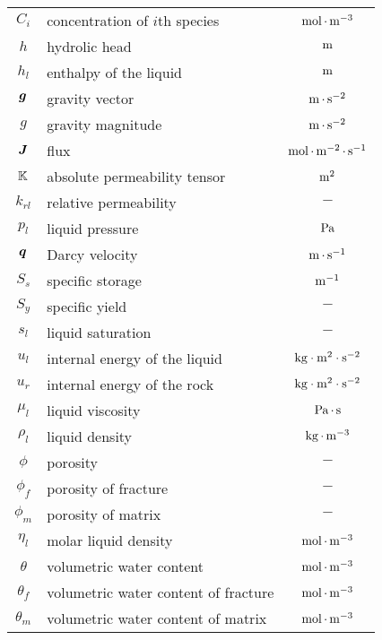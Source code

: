 \begin{center}
\begin{longtable}{cp{7cm}c}
$C_i$      & concentration of $i$th species    &  ${\rm mol}{\,\cdot\,}{\rm m}^{-3}$ \\
$h$        & hydrolic head        &  ${\rm m}$  \\
$h_l$      & enthalpy of the liquid        &  ${\rm m}$  \\
${\boldsymbol{g}}$      & gravity vector       &  ${\rm m}{\,\cdot\,}{\rm s}^{-2}$  \\
$g$        & gravity magnitude    &  ${\rm m}{\,\cdot\,}{\rm s}^{-2}$  \\
${\boldsymbol{J}}$      & flux                 &  ${\rm mol}{\,\cdot\,}{\rm m}^{-2}{\,\cdot\,}{\rm s}^{-1}$  \\
${\mathbb K}$       & absolute permeability tensor & ${\rm m}^2$ \\
$k_{rl}$   & relative permeability&  $-$ \\
$p_l$      & liquid pressure      &  ${\rm Pa}$ \\
${\boldsymbol{q}}$      & Darcy velocity       &  ${\rm m}{\,\cdot\,}{\rm s}^{-1}$  \\
$S_s$      & specific storage     &  ${\rm m}^{-1}$  \\
$S_y$      & specific yield       &  $-$  \\
$s_l$      & liquid saturation    &  $-$ \\
$u_l$      & internal energy of the liquid   &  ${\rm kg}\cdot{\rm m}^2\cdot {\rm s}^{-2}$ \\
$u_r$      & internal energy of the rock     &  ${\rm kg}\cdot{\rm m}^2\cdot {\rm s}^{-2}$  \\
\hline
$\mu_l$    & liquid viscosity     &  ${\rm Pa}{\,\cdot\,}{\rm s}$ \\
$\rho_l$   & liquid density       &  ${\rm kg}{\,\cdot\,}{\rm m}^{-3}$ \\
$\phi$     & porosity             &  $-$  \\
$\phi_f$   & porosity of fracture &  $-$  \\
$\phi_m$   & porosity of matrix   &  $-$  \\
$\eta_l$   & molar liquid density &  ${\rm mol}{\,\cdot\,}{\rm m}^{-3}$ \\
$\theta$   & volumetric water content  &  ${\rm mol}{\,\cdot\,}{\rm m}^{-3}$ \\
$\theta_f$ & volumetric water content of fracture &  ${\rm mol}{\,\cdot\,}{\rm m}^{-3}$ \\
$\theta_m$ & volumetric water content of matrix   &  ${\rm mol}{\,\cdot\,}{\rm m}^{-3}$ \\

\end{longtable}
\end{center}








